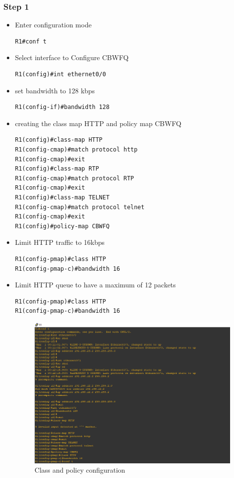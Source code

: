 \documentclass[paper=letter, fontsize=12pt]{article}
\begin{document}
\subsubsection{Step 1}
\begin{itemize}
	\item Enter configuration mode
\begin{verbatim}
R1#conf t
\end{verbatim}
	
	\item Select interface to Configure CBWFQ
\begin{verbatim}
R1(config)#int ethernet0/0
\end{verbatim}
	
	\item set bandwidth to 128 kbps
\begin{verbatim}
R1(config-if)#bandwidth 128
\end{verbatim}

	\item creating the class map HTTP and policy map CBWFQ
\begin{verbatim}
R1(config)#class-map HTTP
R1(config-cmap)#match protocol http
R1(config-cmap)#exit
R1(config)#class-map RTP
R1(config-cmap)#match protocol RTP
R1(config-cmap)#exit
R1(config)#class-map TELNET
R1(config-cmap)#match protocol telnet
R1(config-cmap)#exit
R1(config)#policy-map CBWFQ
\end{verbatim}

	\item Limit HTTP traffic to 16kbps
\begin{verbatim}
R1(config-pmap)#class HTTP
R1(config-pmap-c)#bandwidth 16
\end{verbatim}

	\item Limit HTTP queue to have a maximum of 12 packets
\begin{verbatim}
R1(config-pmap)#class HTTP
R1(config-pmap-c)#bandwidth 16
\end{verbatim}
	\begin{figure}[H]
		\setlength{\parindent}{-5em} 
		\includegraphics[width=550px]{refs/http-bandwidth.png}
		\caption{Class and policy configuration}
	\end{figure}


\end{itemize}
\end{document}
